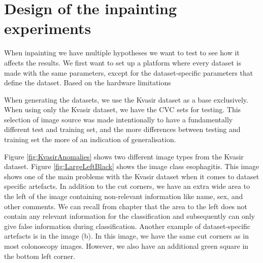 \section{Design of the inpainting experiments}
When inpainting we have multiple hypotheses we want to test to see how it affects the results. We first want to set up a platform where every dataset is made with the same parameters, except for the dataset-specific parameters that define the dataset. Based on the hardware limitations 

When generating the datasets, we use the Kvasir dataset as a base exclusively. When using only the Kvasir dataset, we have the CVC sets for testing. This selection of image source was made intentionally to have a fundamentally different test and training set, and the more differences between testing and training set the more of an indication of generalisation. 


Figure \ref{fig:KvasirAnomalies} shows two different image types from the Kvasir dataset. 
Figure \ref{fig:LargeLeftBlack} shows the image class esophagitis. This image shows one of the main problems with the Kvasir dataset when it comes to dataset specific artefacts. In addition to the cut corners, we have an extra wide area to the left of the image containing non-relevant information like name, sex, and other comments. We can recall from chapter  that the area to the left does not contain any relevant information for the classification and subsequently can only give false information during classification. 
Another example of dataset-specific artefacts is in the image (b). In this image, we have the same cut corners as in most colonoscopy images. However, we also have an additional green square in the bottom left corner.

